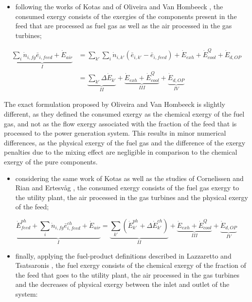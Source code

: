 \documentclass[times,3p]{elsarticle}
\begin{document}
\begin{itemize}
	\item following the works of Kotas \cite{Kotas1995} and of Oliveira and Van Hombeeck \cite{Oliveira1997}, the consumed exergy consists of the exergies of the components present in the feed that are processed as fuel gas as well as the air processed in the gas turbines;
\end{itemize}

\begin{align}
	\underbrace{\sum_i \dot{n}_{i,fg}\bar{e}_{i,feed}+\dot{E}_{air}}_{I}&=\sum_{k'} \sum_i \dot{n}_{i,k'}\left(\bar{e}_{i,k'}-\bar{e}_{i,feed}\right)+\dot{E}_{exh}+\dot{E}^Q_{cool}+\dot{E}_{d,OP} \nonumber\\
	&=\underbrace{\sum_{k'}\Delta\dot{E}_{k'}}_{II}+\underbrace{\dot{E}_{exh}+\dot{E}^Q_{cool}}_{III}+\underbrace{\dot{E}_{d,OP}}_{IV}
	\label{eq:oliveira_nolosses}
\end{align}	
 
 The exact formulation proposed by Oliveira and Van Hombeeck \cite{Oliveira1997} is slightly different, as they defined the consumed exergy as the chemical exergy of the fuel gas, and not as the flow exergy associated with the fraction of the feed that is processed to the power generation system. This results in minor numerical differences, as the physical exergy of the fuel gas and the difference of the exergy penalties due to the mixing effect are negligible in comparison to the chemical exergy of the pure components.  
 
\begin{itemize}
	\item considering the same work of Kotas \cite{Kotas1995} as well as the studies of Cornelissen \cite{Cornelissen1997} and Rian and Ertesv\aa g \cite{Rian2012}, the consumed exergy consists of the fuel gas exergy to the utility plant, the air processed in the gas turbines and the physical exergy of the feed;
\end{itemize} 
 
 \begin{equation}
	\underbrace{\dot{E}^{ph}_{feed}+\sum_i \dot{n}_{i,fg}\bar{e}^{ch}_{i,feed}+\dot{E}_{air}}_{I}=\underbrace{\sum_{k'}\left(\dot{E}^{ph}_{k'}+\Delta{\dot{E}}^{ch}_{k'}\right)}_{II}+\underbrace{\dot{E}_{exh}+\dot{E}^Q_{cool}}_{III}+\underbrace{\dot{E}_{d,OP}}_{IV}
\end{equation}	

\begin{itemize}
	\item finally, applying the fuel-product definitions described in Lazzaretto and Tsatsaronis \cite{Lazzaretto1999,Lazzaretto2006}, the fuel exergy consists of the chemical exergy of the fraction of the feed that goes to the utility plant, the air processed in the gas turbines and the decreases of physical exergy between the inlet and outlet of the system:
\end{itemize}
\end{document}
